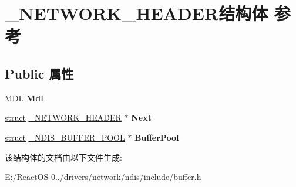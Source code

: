 \hypertarget{struct___n_e_t_w_o_r_k___h_e_a_d_e_r}{}\section{\+\_\+\+N\+E\+T\+W\+O\+R\+K\+\_\+\+H\+E\+A\+D\+E\+R结构体 参考}
\label{struct___n_e_t_w_o_r_k___h_e_a_d_e_r}
\subsection*{Public 属性}
\begin{DoxyCompactItemize}
\item 
\mbox{\label{struct___n_e_t_w_o_r_k___h_e_a_d_e_r_a19da0e5ca2238168b50d274defd06976}} 
M\+DL {\bfseries Mdl}
\item 
\mbox{\label{struct___n_e_t_w_o_r_k___h_e_a_d_e_r_aa264bf2e7b12adf86342aed26c0c2733}} 
\hyperlink{interfacestruct}{struct} \hyperlink{struct___n_e_t_w_o_r_k___h_e_a_d_e_r}{\+\_\+\+N\+E\+T\+W\+O\+R\+K\+\_\+\+H\+E\+A\+D\+ER} $\ast$ {\bfseries Next}
\item 
\mbox{\label{struct___n_e_t_w_o_r_k___h_e_a_d_e_r_a93f4c76f3bab2b7d5bcb71c7735dad40}} 
\hyperlink{interfacestruct}{struct} \hyperlink{struct___n_d_i_s___b_u_f_f_e_r___p_o_o_l}{\+\_\+\+N\+D\+I\+S\+\_\+\+B\+U\+F\+F\+E\+R\+\_\+\+P\+O\+OL} $\ast$ {\bfseries Buffer\+Pool}
\end{DoxyCompactItemize}


该结构体的文档由以下文件生成\+:\begin{DoxyCompactItemize}
\item 
E\+:/\+React\+O\+S-\/0../drivers/network/ndis/include/buffer.\+h\end{DoxyCompactItemize}
